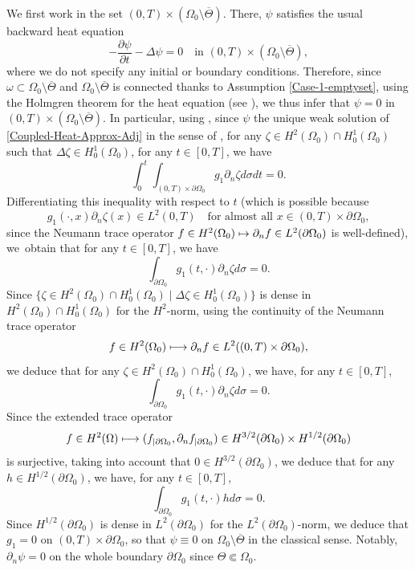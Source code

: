 \documentclass[JEP,XML,SOM,Unicode,NoFloatCountersInSection]{cedram}
\newcommand\mto{\mathchoice{\longmapsto}{\mapsto}{\mapsto}{\mapsto}}
\theoremstyle{definition}
\begin{document}
We first work in the set $(0,T) \times (\Omega_0 \setminus \overline{\Theta})$. There, $\psi$ satisfies the usual backward heat equation
\[
-\dfrac{\partial \psi}{\partial t}-\Delta \psi =0\quad\text{in }(0,T) \times(\Omega_0 \setminus \overline{\Theta}),
\]
where we do not specify any initial or boundary conditions.
Therefore, since $\omega \subset \Omega_0\setminus {\overline{\Theta}}$ and $\Omega_0\setminus {\overline{\Theta}}$ is connected thanks to Assumption \eqref{Case-1-emptyset}, using the Holmgren theorem for the heat equation (see \eg \cite[\S8.6 \& Th.\,8.6.5]{Hormander-2003}), we thus infer that $\psi = 0$ in $(0,T) \times (\Omega_0 \setminus \overline{\Theta})$.
In particular, using \cite[Prop.\,7.1.3]{TWBook}, since $\psi$ the unique weak solution of \eqref{Coupled-Heat-Approx-Adj} in the sense of \cite[Def.\,7.1.2, p.\,342]{TWBook}, for any $\zeta\in H^2(\Omega_0)\cap H^1_0(\Omega_0)$ such that $\Delta \zeta \in H^1_0(\Omega_0)$, for any $t\in [0,T]$, we have
\[
\int_0^t\int_{(0,T)\times\partial\Omega_0}g_1\partial_n \zeta d\sigma dt =0.
\]
Differentiating this inequality with respect to $t$ (which is possible because
\[
g_1(\cdot,x)\partial_n \zeta(x) \in L^2(0,T)\quad \text{for almost all $x\in (0,T)\times\partial\Omega_0$},
\]
since the Neumann trace operator $f\in H^2(\Omega_0) \mto \partial_n f\in L^2(\partial\Omega_0)$ is well-defined), we~obtain that for any $t\in [0,T]$, we have
\[
\int_{\partial\Omega_0}g_1(t,\cdot)\partial_n \zeta d\sigma =0.
\]
Since $\{\zeta \in H^2(\Omega_0)\cap H^1_0(\Omega_0)\mid \Delta \zeta \in H^1_0(\Omega_0)\}$ is dense in $H^2(\Omega_0)\cap H^1_0(\Omega_0)$ for the $H^2$-norm, using the continuity of the Neumann trace operator
\[
f\in H^2(\Omega_0) \mto \partial_n f\in L^2((0,T)\times\partial\Omega_0),
\]
we deduce that for any $\zeta\in H^2(\Omega_0)\cap H^1_0(\Omega_0)$, we have, for any $t\in [0,T]$,
\[
\int_{\partial\Omega_0}g_1(t,\cdot)\partial_n \zeta d\sigma =0.
\]
Since the extended trace operator
\[
f\in H^2(\Omega)\mto (f_{|\partial\Omega_0},\partial_n f_{|\partial\Omega_0}) \in H^{3/2}(\partial\Omega_0)\times H^{1/2}(\partial\Omega_0)
\]
is surjective, taking into account that $0\in H^{3/2}(\partial\Omega_0)$, we deduce that for any $h\in H^{1/2}(\partial\Omega_0)$, we have, for any $t\in [0,T]$,
\[
\int_{\partial\Omega_0}g_1(t,\cdot) h d\sigma =0.
\]
Since $H^{1/2}(\partial\Omega_0)$ is dense in $L^2(\partial\Omega_0)$ for the $L^2(\partial\Omega_0)$-norm, we deduce that $g_1 = 0$ on $(0,T)\times \partial\Omega_0$, so that $\psi \equiv 0$ on $\Omega_0\setminus \overline{\Theta}$ in the classical sense. Notably, $\partial_n \psi= 0$ on the whole boundary $\partial \Omega_0$ since $\Theta \Subset \Omega_0$.
\end{document}
